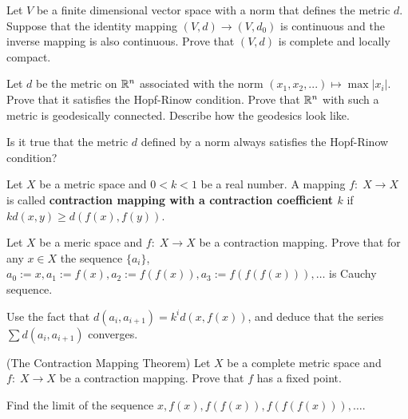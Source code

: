 \documentclass[12pt]{article}
\begin{document}
\begin{zadacha} Let $V$ be a finite dimensional vector space with a norm
that defines the metric $d$. Suppose that the identity mapping
 $(V, d) \to (V, d_0)$ is continuous and the inverse mapping 
 is also continuous. Prove that $(V, d)$ is complete and locally
 compact. 
\end{zadacha}

\begin{zadacha}[*] Let $d$ be the metric on ${\mathbb R}^n$ associated with the norm
 $(x_1, x_2, ... ) \mapsto \max |x_i|$. Prove that it satisfies the
Hopf-Rinow condition. Prove that ${\mathbb R}^n$ with such a metric is
geodesically connected. Describe how the geodesics look like.
\end{zadacha}

\begin{zadacha}[*] Is it true that the metric $d$ defined by a norm always
  satisfies the Hopf-Rinow condition?
\end{zadacha}

\begin{opredelenie} Let $X$ be a metric space and $0<k<1$ be a real
  number. A mapping $f:\; X \to X$ is called {\bf contraction mapping
    with a contraction coefficient $k$} if $k d(x,y) \geq d(f(x),
  f(y))$.
\end{opredelenie}

\begin{zadacha}[!] Let $X$ be a meric space and $f:\; X \to X$ be a
  contraction mapping. Prove that for any
$x \in X$ the sequence  $\{a_i\}$, $a_0 :=x, a_1:=f(x),
a_2:=f(f(x)), a_3:=f(f(f(x))), \dots$ is Cauchy sequence.
\end{zadacha}

\begin{ukazanie} Use the fact that $d(a_i, a_{i+1}) = k^i d(x, f(x))$,
and deduce that the series $\sum d(a_i, a_{i+1})$ converges.
\end{ukazanie}

\begin{zadacha}[!] (The Contraction Mapping Theorem)
Let $X$ be a complete metric space and $f:\; X \to X$ be a contraction
mapping. Prove that $f$ has a fixed point.
\end{zadacha}

\begin{ukazanie} Find the limit of the sequence 
$x, f(x), f(f(x)), f(f(f(x))), \ldots$.
\end{ukazanie}
\end{document}
